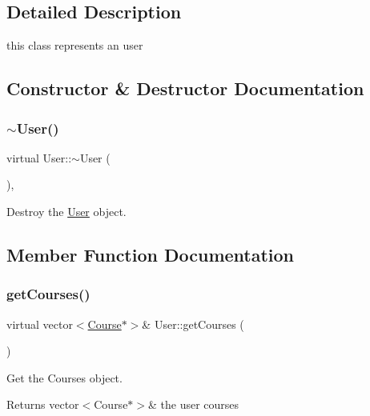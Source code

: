 \subsection{Detailed Description}
this class represents an user 

\subsection{Constructor \& Destructor Documentation}
\mbox{\label{classUser_a7d1cf7c22ba031caec015ec427419513}} 
\subsubsection{\texorpdfstring{$\sim$\+User()}{~User()}}
{\footnotesize\ttfamily virtual User\+::$\sim$\+User (\begin{DoxyParamCaption}{ }\end{DoxyParamCaption})\hspace{0.3cm}{\ttfamily [inline]}, {\ttfamily [virtual]}}



Destroy the \hyperlink{classUser}{User} object. 



\subsection{Member Function Documentation}
\mbox{\label{classUser_a72be855a1f58cc705591413a72a8e346}} 
\subsubsection{\texorpdfstring{get\+Courses()}{getCourses()}}
{\footnotesize\ttfamily virtual vector$<$\hyperlink{classCourse}{Course}$\ast$$>$\& User\+::get\+Courses (\begin{DoxyParamCaption}{ }\end{DoxyParamCaption})\hspace{0.3cm}{\ttfamily [pure virtual]}}



Get the Courses object. 

\begin{DoxyReturn}{Returns}
vector$<$\+Course$\ast$$>$\& the user courses 
\end{DoxyReturn}


